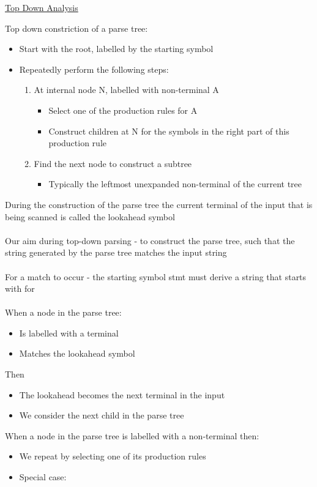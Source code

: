 \documentclass{article}[18pt]
\begin{document}
\begin{center}
\underline{\huge Top Down Analysis}
\end{center}
Top down constriction of a parse tree:
\begin{itemize}
	\item Start with the root, labelled by the starting symbol
	\item Repeatedly perform the following steps:
	\begin{enumerate}
		\item At internal node N, labelled with non-terminal A
		\begin{itemize}
			\item Select one of the production rules for A
			\item Construct children at N for the symbols in the right part of this production rule
		\end{itemize}
		\item Find the next node to construct a subtree
		\begin{itemize}
			\item Typically the leftmost unexpanded non-terminal of the current tree
		\end{itemize}
	\end{enumerate}
\end{itemize}
During the construction of the parse tree the current terminal of the input that is being scanned is called the lookahead symbol\\
\\
Our aim during top-down parsing - to construct the parse tree, such that the string generated by the parse tree matches the input string\\
\\
For a match to occur - the starting symbol stmt must derive a string that starts with for\\
\\
When a node in the parse tree:
\begin{itemize}
	\item Is labelled with a terminal
	\item Matches the lookahead symbol
\end{itemize}
Then
\begin{itemize}
	\item The lookahead becomes the next terminal in the input
	\item We consider the next child in the parse tree
\end{itemize}
When a node in the parse tree is labelled with a non-terminal then:
\begin{itemize}
	\item We repeat by selecting one of its production rules
	\item Special case: 
\end{itemize}
\end{document}
